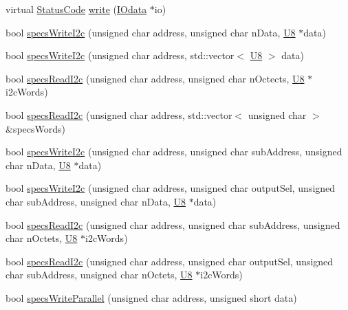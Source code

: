 \begin{DoxyCompactItemize}
\item 
virtual \hyperlink{classStatusCode}{StatusCode} \hyperlink{classSpecsInterface_a33c7224b61bbb8d1ef20680f570ba4bd}{write} (\hyperlink{classIOdata}{IOdata} $\ast$io)
\item 
bool \hyperlink{classSpecsInterface_a20dacf68396a40eadbb740db73ff9624}{specsWriteI2c} (unsigned char address, unsigned char nData, \hyperlink{LSDelayChipV1_8h_a3cb25ca6f51f003950f9625ff05536fc}{U8} $\ast$data)
\item 
bool \hyperlink{classSpecsInterface_a00c49357f1f60e3e50de9a51fa127b79}{specsWriteI2c} (unsigned char address, std::vector$<$ \hyperlink{LSDelayChipV1_8h_a3cb25ca6f51f003950f9625ff05536fc}{U8} $>$ data)
\item 
bool \hyperlink{classSpecsInterface_a7e9a0fe69a998e624ca2d7339b61bcb5}{specsReadI2c} (unsigned char address, unsigned char nOctects, \hyperlink{LSDelayChipV1_8h_a3cb25ca6f51f003950f9625ff05536fc}{U8} $\ast$i2cWords)
\item 
bool \hyperlink{classSpecsInterface_ab61d866ec9b8a48e84a867004c1ed662}{specsReadI2c} (unsigned char address, std::vector$<$ unsigned char $>$ \&specsWords)
\item 
bool \hyperlink{classSpecsInterface_a08dff9a17cd6073cd94fbd2cf7340dbd}{specsWriteI2c} (unsigned char address, unsigned char subAddress, unsigned char nData, \hyperlink{LSDelayChipV1_8h_a3cb25ca6f51f003950f9625ff05536fc}{U8} $\ast$data)
\item 
bool \hyperlink{classSpecsInterface_ae208595624e222a9ff81d112dfbf5a97}{specsWriteI2c} (unsigned char address, unsigned char outputSel, unsigned char subAddress, unsigned char nData, \hyperlink{LSDelayChipV1_8h_a3cb25ca6f51f003950f9625ff05536fc}{U8} $\ast$data)
\item 
bool \hyperlink{classSpecsInterface_acbc22fab91e3dbd33f83b324750baa1f}{specsReadI2c} (unsigned char address, unsigned char subAddress, unsigned char nOctets, \hyperlink{LSDelayChipV1_8h_a3cb25ca6f51f003950f9625ff05536fc}{U8} $\ast$i2cWords)
\item 
bool \hyperlink{classSpecsInterface_ad27047eaae1bc333ee0c1a6c871a407b}{specsReadI2c} (unsigned char address, unsigned char outputSel, unsigned char subAddress, unsigned char nOctets, \hyperlink{LSDelayChipV1_8h_a3cb25ca6f51f003950f9625ff05536fc}{U8} $\ast$i2cWords)
\item 
bool \hyperlink{classSpecsInterface_a232c39e46091c493ad9d061428dd2a8b}{specsWriteParallel} (unsigned char address, unsigned short data)
\item 

\end{DoxyCompactItemize}
